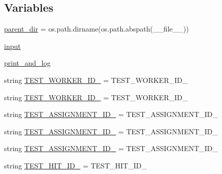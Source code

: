 \subsection*{Variables}
\begin{DoxyCompactItemize}
\item 
\hyperlink{namespaceparlai_1_1mturk_1_1core_1_1dev_1_1test_1_1test__full__system_aa48e49cd2d3f1b7a8d686841d7727a04}{parent\+\_\+dir} = os.\+path.\+dirname(os.\+path.\+abspath(\+\_\+\+\_\+file\+\_\+\+\_\+))
\item 
\hyperlink{namespaceparlai_1_1mturk_1_1core_1_1dev_1_1test_1_1test__full__system_a1e1817cd65688fb90f827834d1fb4567}{input}
\item 
\hyperlink{namespaceparlai_1_1mturk_1_1core_1_1dev_1_1test_1_1test__full__system_a5266aae537d9c5f37809ebaf7bcc3b49}{print\+\_\+and\+\_\+log}
\item 
string \hyperlink{namespaceparlai_1_1mturk_1_1core_1_1dev_1_1test_1_1test__full__system_aac306b3e95efca2846c9dd31c308bd16}{T\+E\+S\+T\+\_\+\+W\+O\+R\+K\+E\+R\+\_\+\+I\+D\+\_} = \textquotesingle{}T\+E\+S\+T\+\_\+\+W\+O\+R\+K\+E\+R\+\_\+\+I\+D\+\_\textquotesingle{}
\item 
string \hyperlink{namespaceparlai_1_1mturk_1_1core_1_1dev_1_1test_1_1test__full__system_af693a6a7005eeaf6854981cfecb703fa}{T\+E\+S\+T\+\_\+\+W\+O\+R\+K\+E\+R\+\_\+\+I\+D\+\_} = \textquotesingle{}T\+E\+S\+T\+\_\+\+W\+O\+R\+K\+E\+R\+\_\+\+I\+D\+\_\textquotesingle{}
\item 
string \hyperlink{namespaceparlai_1_1mturk_1_1core_1_1dev_1_1test_1_1test__full__system_a9858223c7eb6971d591809cb1d46be04}{T\+E\+S\+T\+\_\+\+A\+S\+S\+I\+G\+N\+M\+E\+N\+T\+\_\+\+I\+D\+\_} = \textquotesingle{}T\+E\+S\+T\+\_\+\+A\+S\+S\+I\+G\+N\+M\+E\+N\+T\+\_\+\+I\+D\+\_\textquotesingle{}
\item 
string \hyperlink{namespaceparlai_1_1mturk_1_1core_1_1dev_1_1test_1_1test__full__system_ab84333014fe37ddf5d3220b2802b132c}{T\+E\+S\+T\+\_\+\+A\+S\+S\+I\+G\+N\+M\+E\+N\+T\+\_\+\+I\+D\+\_} = \textquotesingle{}T\+E\+S\+T\+\_\+\+A\+S\+S\+I\+G\+N\+M\+E\+N\+T\+\_\+\+I\+D\+\_\textquotesingle{}
\item 
string \hyperlink{namespaceparlai_1_1mturk_1_1core_1_1dev_1_1test_1_1test__full__system_a490f30bec895dcbcea44cb7f1962dce6}{T\+E\+S\+T\+\_\+\+A\+S\+S\+I\+G\+N\+M\+E\+N\+T\+\_\+\+I\+D\+\_} = \textquotesingle{}T\+E\+S\+T\+\_\+\+A\+S\+S\+I\+G\+N\+M\+E\+N\+T\+\_\+\+I\+D\+\_\textquotesingle{}
\item 
string \hyperlink{namespaceparlai_1_1mturk_1_1core_1_1dev_1_1test_1_1test__full__system_a1ef6e597633468437a2d0f0d65d7f193}{T\+E\+S\+T\+\_\+\+H\+I\+T\+\_\+\+I\+D\+\_} = \textquotesingle{}T\+E\+S\+T\+\_\+\+H\+I\+T\+\_\+\+I\+D\+\_\textquotesingle{}

\end{DoxyCompactItemize}
